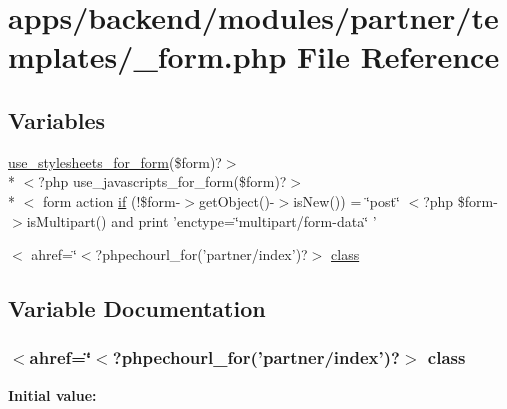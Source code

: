 \hypertarget{backend_2modules_2partner_2templates_2__form_8php}{\section{apps/backend/modules/partner/templates/\-\_\-form.php File Reference}
\label{backend_2modules_2partner_2templates_2__form_8php}
}
\subsection*{Variables}
\begin{DoxyCompactItemize}
\item 
\hyperlink{live_2modules_2user_2templates_2__form_8php_a86bc4522fdbe625b07bc4a4d6eec3df7}{use\-\_\-stylesheets\-\_\-for\-\_\-form}(\$form)?$>$\\*
$<$?php use\-\_\-javascripts\-\_\-for\-\_\-form(\$form)?$>$\\*
$<$ form action \hyperlink{backend_2modules_2partner_2templates_2__form_8php_ae30a307b320d8da5d9a945eaf68f7549}{if} (!\$form-\/$>$get\-Object()-\/$>$is\-New()) = \char`\"{}post\char`\"{} $<$?php \$form-\/$>$is\-Multipart() and print 'enctype=\char`\"{}multipart/form-\/data\char`\"{} '
\item 
$<$ ahref=\char`\"{}$<$?phpechourl\-\_\-for('partner/index')?$>$ \hyperlink{backend_2modules_2partner_2templates_2__form_8php_abe1645604bf8515d6ece4b9e51394ca5}{class}
\end{DoxyCompactItemize}


\subsection{Variable Documentation}
\hypertarget{backend_2modules_2partner_2templates_2__form_8php_abe1645604bf8515d6ece4b9e51394ca5}{
\subsubsection[{class}]{\setlength{\rightskip}{0pt plus 5cm}$<$ahref=\char`\"{}$<$?phpechourl\-\_\-for('partner/index')?$>$ class}}\label{backend_2modules_2partner_2templates_2__form_8php_abe1645604bf8515d6ece4b9e51394ca5}
{\bfseries Initial value\-:}


